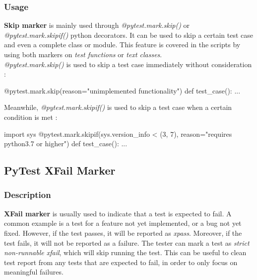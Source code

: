\subsubsection{Usage}
\textbf{Skip marker} is mainly used through \emph{@pytest.mark.skip()} or \emph{@pytest.mark.skipif()} python decorators. It can be used to skip a certain test case and even a complete class or module. This feature is covered in the scripts by using both markers on \emph{test functions} or \emph{text classes}. \\

\emph{@pytest.mark.skip()} is used to skip a test case immediately without consideration :

\begin{python}
@pytest.mark.skip(reason="unimplemented functionality")
def test_case():
    ...
\end{python}

Meanwhile, \emph{@pytest.mark.skipif()} is used to skip a test case when a certain condition is met :

\begin{python}
import sys
@pytest.mark.skipif(sys.version_info < (3, 7), 
reason="requires python3.7 or higher")
def test_case():
    ...
\end{python}

\subsection{PyTest XFail Marker}

\subsubsection{Description}
\textbf{XFail marker} is usually used to indicate that a test is expected to fail. A common example is a test for a feature not yet implemented, or a bug not yet fixed. However, if the test passes, it will be reported as \emph{xpass}. Moreover, if the test fails, it will not be reported as a failure. The tester can mark a test as \emph{strict non-runnable xfail}, which will skip running the test. This can be useful to clean test report from any tests that are expected to fail, in order to only focus on meaningful failures.

